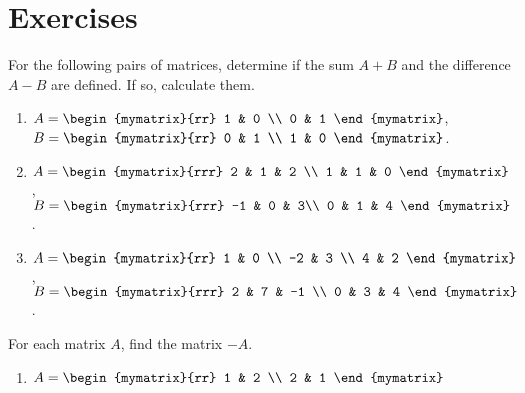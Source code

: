 \section*{Exercises}

\begin{enumialphparenastyle}

\begin{ex}
  For the following pairs of matrices, determine if the sum $A+B$
  and the difference $A-B$ are defined. If so, calculate them.
  \begin{enumerate}
  \item
    $A = \begin{mymatrix}{rr}
      1 & 0 \\
      0 & 1
    \end{mymatrix}$,\quad
    $B = \begin{mymatrix}{rr}
      0 & 1 \\
      1 & 0
    \end{mymatrix}$.

  \item
    $A = \begin{mymatrix}{rrr}
      2 & 1 & 2 \\
      1 & 1 & 0
    \end{mymatrix}$,\quad
    $B = \begin{mymatrix}{rrr}
      -1 & 0 & 3\\
      0 & 1 & 4
    \end{mymatrix}$.

  \item
    $A = \begin{mymatrix}{rr}
      1 & 0 \\
      -2 & 3 \\
      4 & 2
    \end{mymatrix}$,\quad
    $B = \begin{mymatrix}{rrr}
      2 & 7 & -1 \\
      0 & 3 & 4
    \end{mymatrix}$.
  \end{enumerate}
\end{ex}

\begin{ex}
  For each matrix $A$, find the matrix $-A$.
  \begin{enumerate}
  \item
    $A = \begin{mymatrix}{rr}
      1 & 2 \\
      2 & 1
    \end{mymatrix}$


\end{enumerate}
\end{ex}
\end{enumialphparenastyle}
